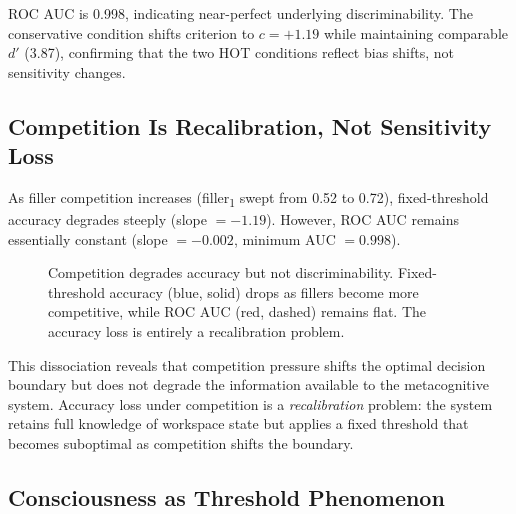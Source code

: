 \documentclass[10pt,letterpaper]{article}
\newcommand{\dprime}{d'}
\begin{document}
ROC AUC is 0.998, indicating near-perfect underlying discriminability.
The conservative condition shifts criterion to $c = +1.19$ while
maintaining comparable $\dprime$ (3.87), confirming that the two HOT
conditions reflect bias shifts, not sensitivity changes.

\subsection{Competition Is Recalibration, Not Sensitivity Loss}

As filler competition increases (filler\textsubscript{1} swept from 0.52
to 0.72), fixed-threshold accuracy degrades steeply (slope $= -1.19$).
However, ROC AUC remains essentially constant (slope $= -0.002$,
minimum AUC $= 0.998$).

\begin{figure}[t]
\centering
{}
\caption{Competition degrades accuracy but not discriminability.
Fixed-threshold accuracy (blue, solid) drops as fillers become more
competitive, while ROC AUC (red, dashed) remains flat.  The accuracy
loss is entirely a recalibration problem.}
\label{fig:competition}
\end{figure}

This dissociation reveals that competition pressure shifts the optimal
decision boundary but does not degrade the information available to the
metacognitive system.  Accuracy loss under competition is a
\emph{recalibration} problem: the system retains full knowledge of
workspace state but applies a fixed threshold that becomes suboptimal
as competition shifts the boundary.

\subsection{Consciousness as Threshold Phenomenon}
\end{document}
